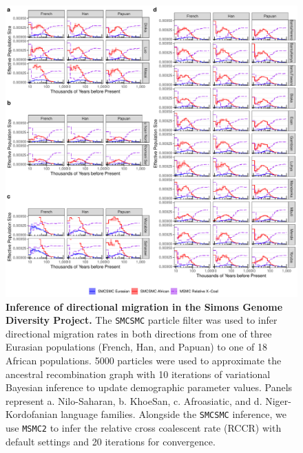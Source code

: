 \documentclass{article}
\begin{document}
\begin{figure}
	\centering
	\includegraphics[width=0.95\linewidth]{plot/sgdp_mig_new.pdf}
	\caption{{\bf Inference of directional migration in the Simons Genome Diversity Project.} The {\tt SMCSMC} particle filter was used to infer directional migration rates in both directions from one of three Eurasian populations (French, Han, and Papuan) to one of 18 African populations. 5000 particles were used to approximate the ancestral recombination graph with 10 iterations of variational Bayesian inference to update demographic parameter values. Panels represent a. Nilo-Saharan, b. KhoeSan, c. Afroasiatic, and d. Niger-Kordofanian language families. Alongside the {\tt SMCSMC} inference, we use {\tt MSMC2} to infer the relative cross coalescent rate (RCCR) with default settings and 20 iterations for convergence.}	
	\label{sgdp_mig}
\end{figure}
\newpage

\end{document}
